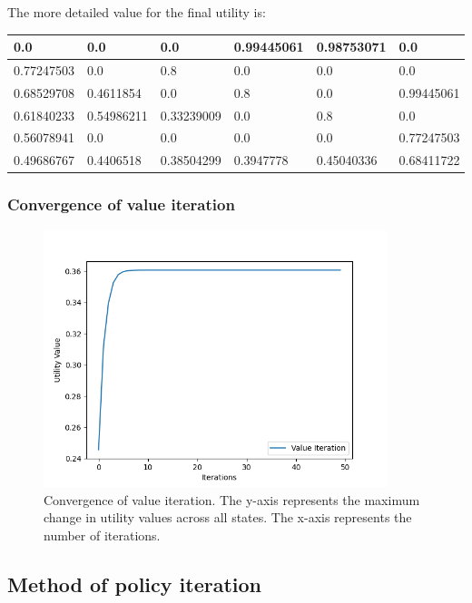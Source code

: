 \documentclass{article}
\begin{document}
The more detailed value for the final utility is:

\begin{table}[H]
    \begin{tabular}{|l|l|l|l|l|l|}
        \hline
        0.0        & 0.0        & 0.0        & 0.99445061 & 0.98753071 & 0.0        \\\hline
        0.77247503 & 0.0        & 0.8        & 0.0        & 0.0        & 0.0        \\\hline
        0.68529708 & 0.4611854  & 0.0        & 0.8        & 0.0        & 0.99445061 \\\hline
        0.61840233 & 0.54986211 & 0.33239009 & 0.0        & 0.8        & 0.0        \\\hline
        0.56078941 & 0.0        & 0.0        & 0.0        & 0.0        & 0.77247503 \\\hline
        0.49686767 & 0.4406518  & 0.38504299 & 0.3947778  & 0.45040336 & 0.68411722 \\\hline
    \end{tabular}
\end{table}

\subsubsection{Convergence of value iteration}

\begin{figure}[H]
    \includegraphics[width=100mm]{../asset/value_iteration_curve.png}
    \caption{Convergence of value iteration. The y-axis represents the maximum change in utility values across all states. The x-axis represents the number of iterations.}
    \label{fig:value_iteration_convergence}
\end{figure}

\subsection{Method of policy iteration}
\end{document}
